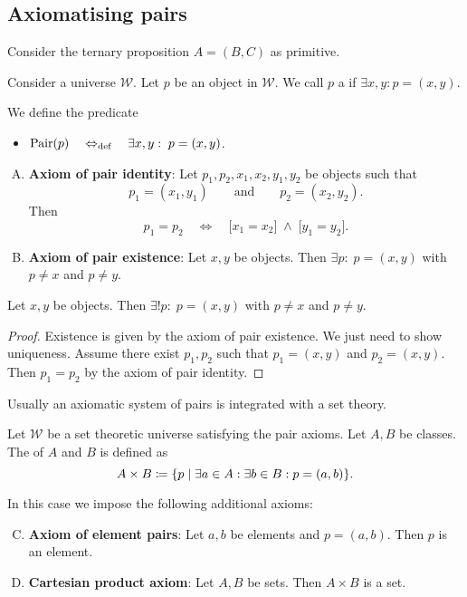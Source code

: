 \subsection{Axiomatising pairs}
Consider the ternary proposition $A = (B,C)$ as primitive. 
\begin{definition}
Consider a universe $\mathcal{W}$. Let $p$ be an object in $\mathcal{W}$. We call $p$ a  if $\exists x,y: p = (x,y)$.

We define the predicate
\begin{itemize}
\item $\operatorname{Pair}(p) \quad\Leftrightarrow_{\text{def}}\quad \exists x,y: \; p = (x, y)$.
\end{itemize}
\end{definition}

\begin{enumerate}[(A)] \setcounter{enumi}{0}
\item \textbf{Axiom of pair identity}: Let $p_1, p_2,x_1,x_2,y_1,y_2$ be objects such that
\[ p_1 = (x_1, y_1) \qquad \text{and}\qquad p_2 = (x_2, y_2). \]
Then
\[ p_1 = p_2 \quad\iff\quad \big[x_1 = x_2\big] \;\land\; \big[y_1 = y_2\big]. \]
\item \textbf{Axiom of pair existence}: Let $x,y$ be objects. Then $\exists p: \; p = (x,y)$ with $p\neq x $ and $p \neq y$.
\end{enumerate}

\begin{lemma}
Let $x,y$ be objects. Then $\exists! p: \; p = (x,y)$ with $p\neq x $ and $p \neq y$.
\end{lemma}
\begin{proof}
Existence is given by the axiom of pair existence. We just need to show uniqueness. Assume there exist $p_1, p_2$ such that $p_1 = (x,y)$ and $p_2 = (x,y)$. Then $p_1 = p_2$ by the axiom of pair identity.
\end{proof}

Usually an axiomatic system of pairs is integrated with a set theory.
\begin{definition}
Let $\mathcal{W}$ be a set theoretic universe satisfying the pair axioms. Let $A,B$ be classes. The  of $A$ and $B$ is defined as
\[ A\times B \defeq \setbuilder{p}{\exists a\in A: \exists b\in B: p = (a,b)}. \]
\end{definition}

In this case we impose the following additional axioms:
\begin{enumerate}[(A)] \setcounter{enumi}{2}
\item \textbf{Axiom of element pairs}: Let $a,b$ be elements and $p=(a,b)$. Then $p$ is an element.
\item \textbf{Cartesian product axiom}: Let $A,B$ be sets. Then $A \times B$ is a set.
\end{enumerate}

